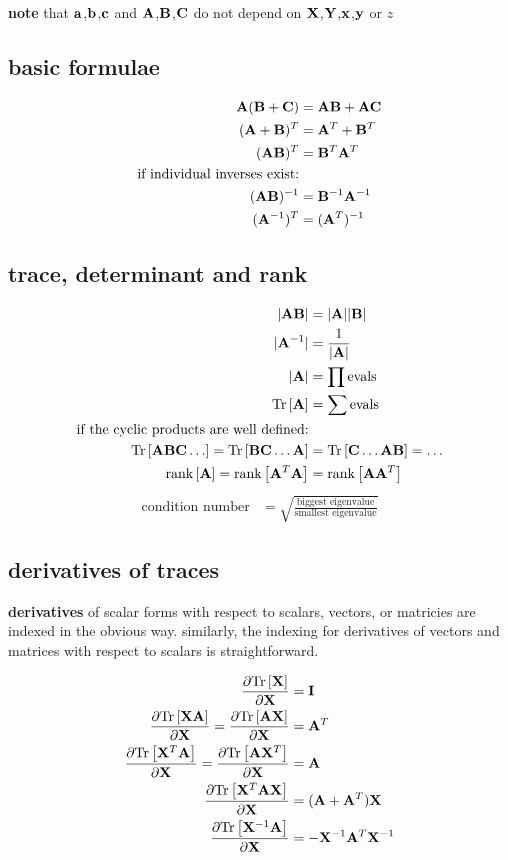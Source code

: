 \documentclass[12pt]{article}
\begin{document}
\noindent \textbf{note}
that $\aaa$,$\bb$,$\cc$ and $\AA$,$\BB$,$\CC$ 
do not depend on $\XX$,$\YY$,$\xx$,$\yy$ or $z$

\subsection{basic formulae}
\begin{align}
\AA(\BB + \CC) & = \AA\BB + \AA \CC \\
(\AA + \BB)^T & = \AA^T + \BB^T \\
(\AA\BB)^T & = \BB^T \AA^T \\
\text{if individual inverses exist:} \nonumber\\
(\AA\BB)^{-1} & = \BB^{-1}\AA^{-1} \\
(\AA^{-1})^T & = (\AA^T)^{-1}
\end{align}

\subsection{trace, determinant and rank}
\begin{align}
|\AA \BB| & = |\AA| |\BB| \\
|\AA^{-1}| & = \frac{1}{|\AA|} \\
|\AA| & = \prod \text{evals} \\
\trace{\AA} & = \sum \text{evals} \\
\text{if the cyclic products are well defined:} \nonumber\\
\trace{\AA\BB\CC \dots}   = \trace{\BB\CC \dots \AA}
                        & = \trace{\CC \dots \AA\BB}
                          = \dots \\
\rank{\AA}   = \rank{\AA^T\AA}
           & = \rank{\AA\AA^T}
\end{align}
\begin{align}
\text{condition number} & = \sqrt{\frac{\text{biggest
eigenvalue}}{\text{smallest eigenvalue}}}
\end{align}

\subsection{derivatives of traces}
\noindent \textbf{derivatives}
of scalar forms with respect to scalars, vectors, or
matricies are indexed in the obvious way. similarly, the indexing for
derivatives of vectors and matrices with respect to scalars is
straightforward.

\begin{align}
\frac{\partial \trace{\XX}}{\partial \XX} &= \II \\
\frac{\partial \trace{\XX \AA}}{\partial \XX} =
\frac{\partial \trace{\AA \XX}}{\partial \XX} &= \AA^T\\
\frac{\partial \trace{\XX^T \AA}}{\partial \XX} =
\frac{\partial \trace{\AA \XX^T}}{\partial \XX} &= \AA\\
\frac{\partial \trace{\XX^T\AA \XX}}{\partial \XX} &= (\AA+\AA^T)\XX \\
\frac{\partial \trace{\XX^{-1} \AA}}{\partial \XX} &= 
-\XX^{-1} \AA^T \XX^{-1}
\end{align}
\end{document}

